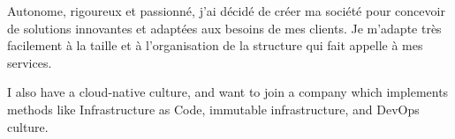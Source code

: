 

\begin{cvparagraph}

Autonome, rigoureux et passionné, j'ai décidé de créer ma société pour concevoir de solutions innovantes et adaptées aux besoins de mes clients. Je m'adapte très facilement à la taille et à l'organisation de la structure qui fait appelle à mes services.


I also have a cloud-native culture, and want to join a company which implements methods like Infrastructure as Code, immutable infrastructure, and DevOps culture.
\end{cvparagraph}

